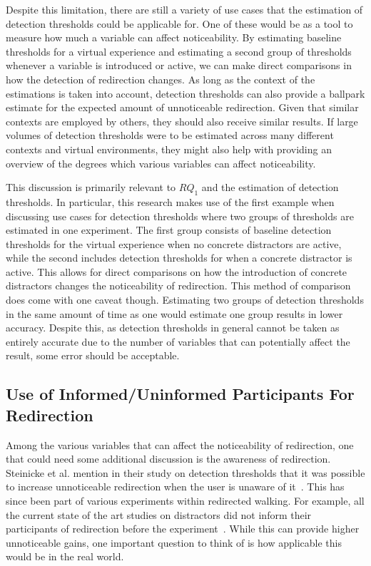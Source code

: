 Despite this limitation, there are still a variety of use cases that the estimation of detection thresholds could be applicable for. One of these would be as a tool to measure how much a variable can affect noticeability. By estimating baseline thresholds for a virtual experience and estimating a second group of thresholds whenever a variable is introduced or active, we can make direct comparisons in how the detection of redirection changes. As long as the context of the estimations is taken into account, detection thresholds can also provide a ballpark estimate for the expected amount of unnoticeable redirection. Given that similar contexts are employed by others, they should also receive similar results. If large volumes of detection thresholds were to be estimated across many different contexts and virtual environments, they might also help with providing an overview of the degrees which various variables can affect noticeability. 

This discussion is primarily relevant to $RQ_1$ and the estimation of detection thresholds. In particular, this research makes use of the first example when discussing use cases for detection thresholds where two groups of thresholds are estimated in one experiment. The first group consists of baseline detection thresholds for the virtual experience when no concrete distractors are active, while the second includes detection thresholds for when a concrete distractor is active. This allows for direct comparisons on how the introduction of concrete distractors changes the noticeability of redirection. This method of comparison does come with one caveat though. Estimating two groups of detection thresholds in the same amount of time as one would estimate one group results in lower accuracy. Despite this, as detection thresholds in general cannot be taken as entirely accurate due to the number of variables that can potentially affect the result, some error should be acceptable. 

\subsection{Use of Informed/Uninformed Participants For Redirection}
Among the various variables that can affect the noticeability of redirection, one that could need some additional discussion is the awareness of redirection. Steinicke et al. mention in their study on detection thresholds that it was possible to increase unnoticeable redirection when the user is unaware of it~\cite{5072212}. This has since been part of various experiments within redirected walking. For example, all the current state of the art studies on distractors did not inform their participants of redirection before the experiment~\cite{sra2018vmotion, chen2017towards, chen2017supporting}. While this can provide higher unnoticeable gains, one important question to think of is how applicable this would be in the real world. 

